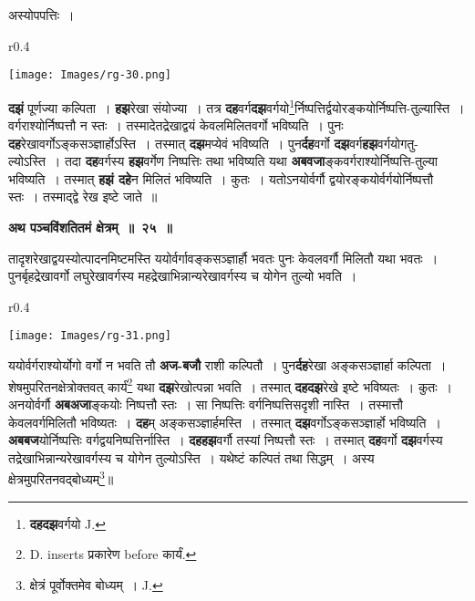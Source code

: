 \documentclass[11pt, openany]{book}
\begin{document}
\begin{center}
अस्योपपत्तिः~।
\end{center}

\begin{wrapfigure}{r}{0.4\textwidth}
\vspace{-8mm}
\begin{center}
\texttt{[image: Images/rg-30.png]}
\end{center}
\vspace{-8mm}
\end{wrapfigure}

\textbf{दझं} पूर्णज्या कल्पिता~। \textbf{हझ}रेखा संयोज्या~। तत्र \textbf{दह}वर्ग\textbf{दझ}वर्गयो\renewcommand{\thefootnote}{१}\footnote{\textbf{दहदझ}वर्गयो {\en J.}}र्निष्पत्तिर्द्वयोरङ्कयोर्निष्पत्ति-तुल्यास्ति~। वर्गराश्योर्निष्पत्तौ न स्तः~। तस्मादेतद्रेखाद्वयं केवलमिलितवर्गो भविष्यति~। पुनः \textbf{दह}रेखावर्गोऽङ्कसञ्ज्ञार्होऽस्ति~। तस्मात् \textbf{दझ}मप्येवं भविष्यति~। \;पुन\textbf{र्दह}वर्गो \;\textbf{दझ}वर्ग\textbf{हझ}वर्गयोगतु-ल्योऽस्ति~। तदा \textbf{दह}वर्गस्य \textbf{हझ}वर्गेण निष्पत्तिः तथा भविष्यति यथा \textbf{अबवजा}ङ्कवर्गराश्योर्निष्पत्ति-तुल्या भविष्यति~। तस्मात् \textbf{हझं दहे}न मिलितं भविष्यति~। कुतः~। यतोऽनयोर्वर्गौ द्वयोरङ्कयोर्वर्गयोर्निष्पत्तौ स्तः~। तस्माद्द्वे रेख इष्टे जाते~॥ 
\vspace{2mm}

\begin{center}
\textbf{\large  अथ पञ्चविंशतितमं क्षेत्रम्~॥~२५~॥}
\end{center}

{\ab तादृशरेखाद्वयस्योत्पादनमिष्टमस्ति ययोर्वर्गावङ्कसञ्ज्ञार्हौ भवतः पुनः केवलवर्गौ मिलितौ यथा भवतः~। पुनर्बृहद्रेखावर्गो लघुरेखावर्गस्य महद्रेखाभिन्नान्यरेखावर्गस्य च योगेन तुल्यो भवति~। }

\newpage

\begin{wrapfigure}{r}{0.4\textwidth}
\vspace{-8mm}
\begin{center}
\texttt{[image: Images/rg-31.png]}
\end{center}
\vspace{-8mm}
\end{wrapfigure}

 ययोर्वर्गराश्योर्योगो वर्गो न भवति तौ \textbf{अज-बजौ} राशी कल्पितौ~। पुन\textbf{र्दह}रेखा अङ्कसञ्ज्ञार्हा कल्पिता~। शेषमुपरितनक्षेत्रोक्तवत् कार्यं\renewcommand{\thefootnote}{१}\footnote{{\en D. inserts} प्रकारेण {\en before} कार्यं.} यथा \textbf{दझ}रेखोत्पन्ना भवति~। तस्मात् \textbf{दहदझ}रेखे इष्टे भविष्यतः~। कुतः~। अनयोर्वर्गौ \textbf{अबअजा}ङ्कयोः निष्पत्तौ स्तः~। सा निष्पत्तिः वर्गनिष्पत्तिसदृशी नास्ति~। तस्मात्तौ केवलवर्गमिलितौ भविष्यतः~। \textbf{दह}म् अङ्कसञ्ज्ञार्हमस्ति~। तस्मात् \textbf{दझ}वर्गोऽङ्कसञ्ज्ञार्हो भविष्यति~। \textbf{अबबज}योर्निष्पत्तिः वर्गद्वयनिष्पत्तिर्नास्ति~। \textbf{दहहझ}वर्गौ तस्यां निष्पत्तौ स्तः~।  तस्मात् \textbf{दह}वर्गो \textbf{दझ}वर्गस्य तद्रेखाभिन्नान्यरेखावर्गस्य च योगेन तुल्योऽस्ति~। यथेष्टं कल्पितं तथा सिद्धम्~। अस्य क्षेत्रमुपरितनवद्बोध्यम्\renewcommand{\thefootnote}{२}\footnote{क्षेत्रं पूर्वोक्तमेव बोध्यम्~। {\en J.}}\;॥ 
\vspace{2mm}
\end{document}
